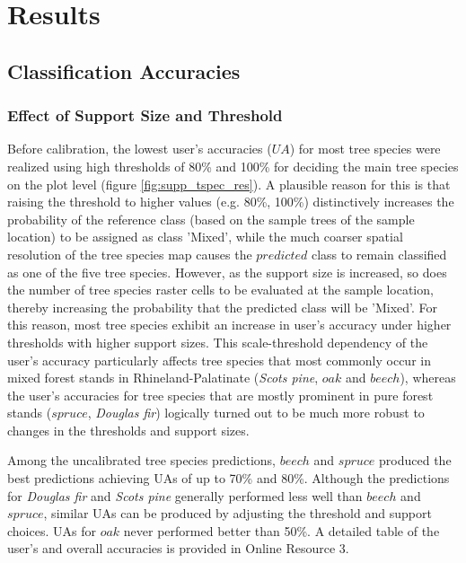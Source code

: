 \section{Results}
\label{sec:Res}

\subsection{Classification Accuracies}
\label{sec:supp_tspec_res}

\subsubsection*{Effect of Support Size and Threshold}

Before calibration, the lowest user's accuracies ($UA$) for most tree species were realized using high thresholds of 80\% and 100\% for deciding the main tree species on the plot level (figure \ref{fig:supp_tspec_res}). A plausible reason for this is that raising the threshold to higher values (e.g. 80\%, 100\%) distinctively increases the probability of the reference class (based on the sample trees of the sample location) to be assigned as class 'Mixed', while the much coarser spatial resolution of the tree species map causes the $predicted$ class to remain classified as one of the five tree species. However, as the support size is  increased, so does the number of tree species raster cells to be evaluated at the sample location, thereby increasing the probability that the predicted class will be 'Mixed'. For this reason, most tree species exhibit an increase in user's accuracy under higher thresholds with higher support sizes. This scale-threshold dependency of the user's accuracy particularly affects tree species that most commonly occur in mixed forest stands in Rhineland-Palatinate (\textit{Scots pine}, $oak$ and $beech$), whereas the user's accuracies for tree species that are mostly prominent in pure forest stands ($spruce$, \textit{Douglas fir}) logically turned out to be much more robust to changes in the thresholds and support sizes.\par
Among the uncalibrated tree species predictions, $beech$ and $spruce$ produced the best predictions achieving UAs of up to 70\% and 80\%.  Although the predictions for \textit{Douglas fir} and \textit{Scots pine} generally performed less well than $beech$ and $spruce$, similar UAs can be produced by adjusting the threshold and support choices. UAs for $oak$ never performed better than 50\%. A detailed table of the user's and overall accuracies is provided in Online Resource 3.

